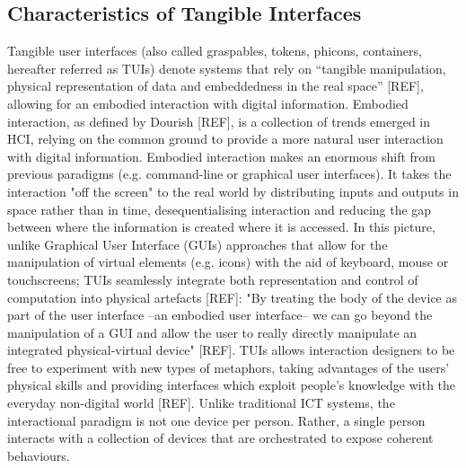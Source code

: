 \subsection{Characteristics of Tangible Interfaces}
Tangible user interfaces (also called graspables, tokens, phicons, containers, hereafter referred as TUIs) denote systems that rely on “tangible manipulation, physical representation of data and embeddedness in the real space” [REF], allowing for an embodied interaction with digital information. Embodied interaction, as defined by Dourish [REF], is a collection of trends emerged in HCI, relying on the common ground to provide a more natural user interaction with digital information. Embodied interaction makes an enormous shift from previous paradigms (e.g. command-line or graphical user interfaces). It takes the interaction "off the screen" to the real world by distributing inputs and outputs in space rather than in time, desequentialising interaction and reducing the gap between where the information is created where it is accessed. In this picture, unlike Graphical User Interface (GUIs) approaches that allow for the manipulation of virtual elements (e.g. icons) with the aid of keyboard, mouse or touchscreens; TUIs seamlessly integrate both representation and control of computation into physical artefacts [REF]: "By treating the body of the device as part of the user interface –an embodied user interface– we can go beyond the manipulation of a GUI and allow the user to really directly manipulate an integrated physical-virtual device" [REF]. TUIs allows interaction designers to be free to experiment with new types of metaphors, taking advantages of the users' physical skills and providing interfaces which exploit people’s knowledge with the everyday non-digital world [REF]. Unlike traditional ICT systems, the interactional paradigm is not one device per person. Rather, a single person interacts with a collection of devices that are orchestrated to expose coherent behaviours.
